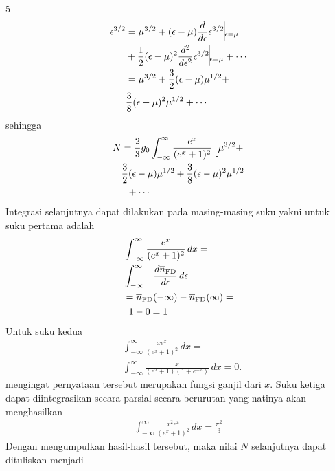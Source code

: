 \documentclass[a4paper  , 6 pt]{article}
\begin{document}
\begin{tiny}
\begin{multicols} {5}
\begin{align}
\epsilon^{3/2}& = \mu^{3/2} + (\epsilon - \mu  ) \frac{d}{d \epsilon} \epsilon^{3/2} \vline_{\epsilon = \mu } \nonumber \\
&+ \frac{1}{2} (\epsilon - \mu )^2  \frac{d^2}{d \epsilon^2} \epsilon^{3/2} \vline_{\epsilon = \mu } + \cdots \nonumber \\ 
& = \mu^{3/2} + \frac{3}{2} (\epsilon -\mu )\mu^{1/2} + \nonumber \\
& \frac{3}{8} (\epsilon - \mu )^2 \mu^{1/2} + \cdots  
 \end{align}
sehingga 
\begin{align}
N & = \frac{2}{3} g_0 \int_{-\infty}^{\infty} \frac{e^x}{(e^x + 1)^2} \left [ \mu^{ 3/2} + \right. \nonumber \\
 & \frac{3}{2} (\epsilon - \mu )\mu^{1/2}  + \frac{3}{8} (\epsilon - \mu)^2 \mu^{1/2}\nonumber \\
 & \hspace{0.2 cm } + \cdots 
\end{align}
Integrasi selanjutnya dapat dilakukan pada masing-masing suku yakni untuk suku pertama adalah
\begin{align}
&\int_{- \infty}^{\infty} \frac{e^x}{(e^x + 1)^2} \, dx  = 
\nonumber \\
& \int_{- \infty}^{\infty} - \frac{d \overline{n}_\mathrm{FD}}{d \epsilon} \, d\epsilon \nonumber \\
& = \overline{n}_\mathrm{FD} (- \infty) - \overline{ n}_\mathrm{FD} (\infty)  =\nonumber \\
& \hspace{0.2 cm } 1- 0 =1
 \end{align}
 Untuk suku kedua 
 \begin{align}
& \int_{-\infty}^{\infty} \frac{x e^x }{(e^x + 1)^2}  \, dx =   \nonumber \\
 & \int_{-\infty}^{\infty} \frac{x}{(e^x + 1)(1+ e^{-x})} \, dx  = 0. 
 \end{align}
 mengingat pernyataan tersebut merupakan fungsi ganjil dari $x$. \newline
 Suku ketiga dapat diintegrasikan secara parsial secara berurutan yang natinya akan menghasilkan 
 \begin{align}
 \int_{- \infty}^{\infty} \frac{x^2 e^x }{(e^x +1)^2 } \,  dx = \frac{\pi^2}{3} 
 \end{align}
 Dengan mengumpulkan hasil-hasil tersebut, maka nilai $N$ selanjutnya dapat dituliskan menjadi
 \begin{align}

\end{align}
\end{multicols}
\end{tiny}
\end{document}
